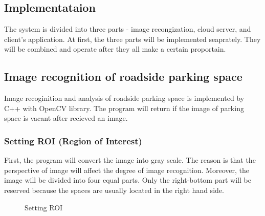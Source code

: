 \documentclass[runningheads,a4paper]{llncs}
\begin{document}
\begin{CJK}{UTF8}{bsmi}
\section{Implementataion}\label{sec:implementation}

The system is divided into three parts - image recongization, cloud
server, and client's application. At first, the three parts will be implemented
seaprately. They will be combined and operate after they all make a certain proportain.

\subsection{Image recognition of roadside parking space}

Image recoginition and analysis of roadside parking space is implemented by C++ with
OpenCV library. The program will return if the image of parking space is
vacant after recieved an image.

\subsubsection{Setting ROI (Region of Interest)}

First, the program will convert the image into gray scale. The reason is
that the perspective of image will affect the degree of image
recognition. Moreover, the image will be divided into four equal parts.
Only the right-bottom part will be reserved because the spaces are
usually located in the right hand side.

\begin{figure}
	\hspace{0.5in}
	\caption{Setting ROI}
	\label{fig:ROI}
\end{figure}


\end{CJK}
\end{document}
